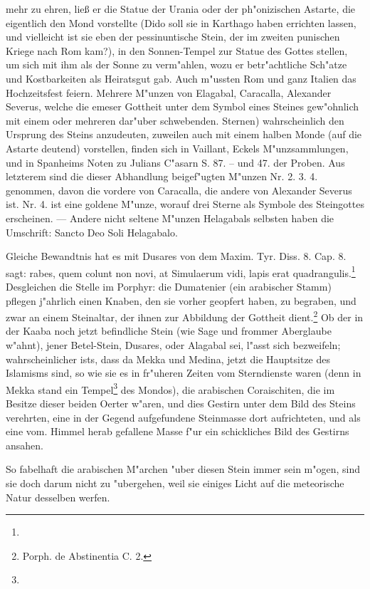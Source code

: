 \documentclass[a4paper, 11pt, oneside, polutonikogreek, german]{article}
\begin{document}
mehr zu ehren, ließ er die Statue der Urania oder der ph"onizischen Astarte, die eigentlich den Mond vorstellte (Dido soll sie in Karthago haben errichten lassen, und vielleicht ist sie eben der pessinuntische Stein, der im zweiten punischen Kriege nach Rom kam?), in den Sonnen-Tempel zur Statue des Gottes stellen, um sich mit ihm als der Sonne zu verm"ahlen, wozu er betr"achtliche Sch"atze und Kostbarkeiten als Heiratsgut gab. Auch m"ussten Rom und ganz Italien das Hochzeitsfest feiern. Mehrere M"unzen von Elagabal, Caracalla, Alexander Severus, welche die emeser Gottheit unter dem Symbol eines Steines gew"ohnlich mit einem oder mehreren dar"uber schwebenden. Sternen) wahrscheinlich den Ursprung des Steins anzudeuten, zuweilen auch mit einem halben Monde (auf die Astarte deutend) vorstellen, finden sich in Vaillant, Eckels M"unzsammlungen, und in Spanheims Noten zu Julians C"asarn S. 87. -- und 47. der Proben. Aus letzterem sind die dieser Abhandlung beigef"ugten M"unzen Nr. 2. 3. 4. genommen, davon die vordere von Caracalla, die andere von Alexander Severus ist. Nr. 4. ist eine goldene M"unze, worauf drei Sterne als Symbole des Steingottes erscheinen. --- Andere nicht seltene M"unzen Helagabals selbsten haben die Umschrift: Sancto Deo Soli Helagabalo.

Gleiche Bewandtnis hat es mit Dusares von dem Maxim. Tyr. Diss. 8. Cap. 8. sagt: rabes, quem colunt non novi, at Simulaerum vidi, lapis erat quadrangulis.\footnote{} Desgleichen die Stelle im Porphyr: die Dumatenier (ein arabischer Stamm) pflegen j"ahrlich einen Knaben, den sie vorher geopfert haben, zu begraben, und zwar an einem Steinaltar, der ihnen zur Abbildung der Gottheit dient.\footnote{Porph. de Abstinentia C. 2.} Ob der in der Kaaba noch jetzt befindliche Stein (wie Sage und frommer Aberglaube w"ahnt), jener Betel-Stein, Dusares, oder Alagabal sei, l"asst sich bezweifeln; wahrscheinlicher ists, dass da Mekka und Medina, jetzt die Hauptsitze des Islamisms sind, so wie sie es in fr"uheren Zeiten vom Sterndienste waren (denn in Mekka stand ein Tempel\footnote{} des Mondos), die arabischen Coraischiten, die im Besitze dieser beiden Oerter w"aren, und dies Gestirn unter dem Bild des Steins verehrten, eine in der Gegend aufgefundene Steinmasse dort aufrichteten, und als eine vom. Himmel herab gefallene Masse f"ur ein schickliches Bild des Gestirns ansahen.

So fabelhaft die arabischen M"archen "uber diesen Stein immer sein m"ogen, sind sie doch darum nicht zu "ubergehen, weil sie einiges Licht auf die meteorische Natur desselben werfen.
\end{document}
